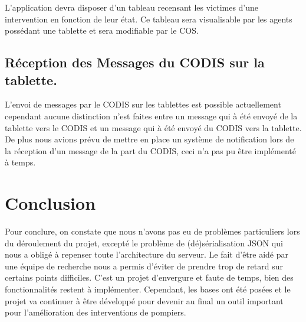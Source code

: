 \documentclass{article}
\begin{document}
L’application devra disposer d’un tableau recensant les victimes d’une intervention en fonction de leur état. Ce tableau sera visualisable par les agents possédant une tablette et sera modifiable par le COS.

\subsection{Réception des Messages du CODIS sur la tablette.}

L’envoi de messages par le CODIS sur les tablettes est possible actuellement cependant aucune distinction n’est faites entre un message qui à été envoyé de la tablette vers le CODIS et un message qui à été envoyé du CODIS vers la tablette. De plus nous avions prévu de mettre en place un système de notification lors de la réception d’un message de la part du CODIS, ceci n’a pas pu être implémenté à temps.


\section{Conclusion}
Pour conclure, on constate que nous n’avons pas eu de problèmes particuliers lors du déroulement du projet, excepté le problème de (dé)sérialisation JSON qui nous a obligé à repenser toute l’architecture du serveur. Le fait d’être aidé par une équipe de recherche nous a permis d’éviter de prendre trop de retard sur certains points difficiles. C’est un projet d’envergure et faute de temps, bien des fonctionnalités restent à implémenter. Cependant, les bases ont été posées et le projet va continuer à être développé pour devenir au final un outil important pour l’amélioration des interventions de pompiers.
\end{document}
